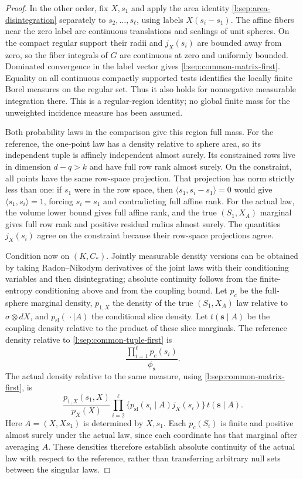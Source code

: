 \begin{proof}
In the other order, fix \(X,s_1\) and apply the area identity
\eqref{l:sep:area-disintegration} separately to
\(s_2,\ldots,s_\ell\), using labels
\(X(s_i-s_1)\).  The affine fibers near the zero label are
continuous translations and scalings of unit spheres.  On the
compact regular support their radii and \(j_X(s_i)\) are bounded
away from zero, so the fiber integrals of \(G\) are continuous at
zero and uniformly bounded.  Dominated convergence in the label
vector gives \eqref{l:sep:common-matrix-first}.  Equality on all
continuous compactly supported tests identifies the locally finite
Borel measures on the regular set.  Thus it also holds for
nonnegative measurable integration there.  This is a regular-region
identity; no global finite mass for the unweighted incidence measure
has been assumed.

Both probability laws in the comparison give this region full mass.
For the reference, the one-point law has a density relative to
sphere area, so its independent tuple is affinely independent
almost surely.  Its constrained rows live in dimension \(d-q>k\)
and have full row rank almost surely.  On the constraint, all
points have the same row-space projection.  That projection has
norm strictly less than one: if \(s_1\) were in the row space,
then \(\langle s_1,s_i-s_1\rangle=0\) would give
\(\langle s_1,s_i\rangle=1\), forcing \(s_i=s_1\) and contradicting
full affine rank.  For the actual law, the volume lower bound gives
full affine rank, and the true \((S_1,X_A)\) marginal gives full
row rank and positive residual radius almost surely.  The quantities
\(j_X(s_i)\) agree on the constraint because their row-space
projections agree.

Condition now on \((K,C_*)\).  Jointly measurable density versions
can be obtained by taking Radon--Nikodym derivatives of the joint
laws with their conditioning variables and then disintegrating;
absolute continuity follows from the finite-entropy conditioning
above and from the coupling bound.  Let \(p_c\) be the full-sphere
marginal density, \(p_{1,X}\) the density of the true
\((S_1,X_A)\) law relative to \(\sigma\otimes dX\), and
\(p_{\mathrm{sl}}(\,\cdot\mid A)\) the conditional slice density.
Let \(t(\mathbf s\mid A)\) be the coupling density relative to the
product of these slice marginals.  The reference density relative
to \eqref{l:sep:common-tuple-first} is
\[
 \frac{\prod_{i=1}^{\ell}p_c(s_i)}{\phi_{\mathbf s}}.
\]
The actual density relative to the same measure, using
\eqref{l:sep:common-matrix-first}, is
\[
 \frac{p_{1,X}(s_1,X)}{p_X(X)}
       \prod_{i=2}^{\ell}
       \{p_{\mathrm{sl}}(s_i\mid A)j_X(s_i)\}\,
       t(\mathbf s\mid A).
\]
Here \(A=(X,Xs_1)\) is determined by \(X,s_1\).  Each \(p_c(S_i)\)
is finite and positive almost surely under the actual law, since
each coordinate has that marginal after averaging \(A\).  These
densities therefore establish absolute continuity of the actual
law with respect to the reference, rather than transferring
arbitrary null sets between the singular laws.


\end{proof}
